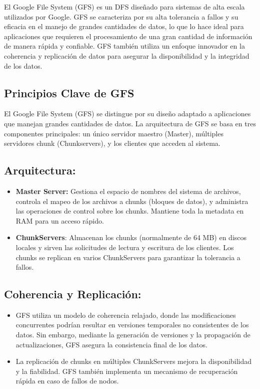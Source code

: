 El Google File System (GFS) es un DFS diseñado para sistemas de alta escala utilizados por Google. GFS se caracteriza por su alta tolerancia a fallos y su eficacia en el manejo de grandes cantidades de datos, lo que lo hace ideal para aplicaciones que requieren el procesamiento de una gran cantidad de información de manera rápida y confiable. GFS también utiliza un enfoque innovador en la coherencia y replicación de datos para asegurar la disponibilidad y la integridad de los datos.

\subsection{Principios Clave de GFS}

El Google File System (GFS) se distingue por su diseño adaptado a aplicaciones que manejan grandes cantidades de datos. La arquitectura de GFS se basa en tres componentes principales: un único servidor maestro (Master), múltiples servidores chunk (Chunkservers), y los clientes que acceden al sistema.

\subsection{Arquitectura:}

\begin{itemize}
    \item \textbf{Master Server:} Gestiona el espacio de nombres del sistema de archivos, controla el mapeo de los archivos a chunks (bloques de datos), y administra las operaciones de control sobre los chunks. Mantiene toda la metadata en RAM para un acceso rápido.
    \item \textbf{ChunkServers}: Almacenan los chunks (normalmente de 64 MB) en discos locales y sirven las solicitudes de lectura y escritura de los clientes. Los chunks se replican en varios ChunkServers para garantizar la tolerancia a fallos.
\end{itemize}

\subsection{Coherencia y Replicación:}

\begin{itemize}
    \item GFS utiliza un modelo de coherencia relajado, donde las modificaciones concurrentes podrían resultar en versiones temporales no consistentes de los datos. Sin embargo, mediante la generación de versiones y la propagación de actualizaciones, GFS asegura la consistencia final de los datos.
    \item La replicación de chunks en múltiples ChunkServers mejora la disponibilidad y la fiabilidad. GFS también implementa un mecanismo de recuperación rápida en caso de fallos de nodos.
\end{itemize}

